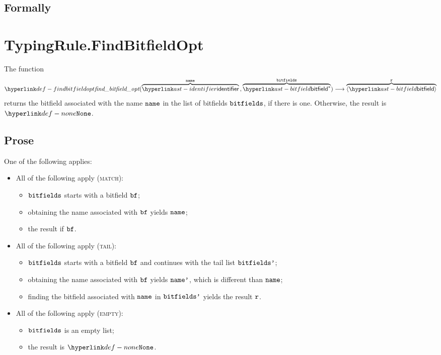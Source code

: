 \subsection{Formally}

\section{TypingRule.FindBitfieldOpt}
\hypertarget{def-findbitfieldopt}{}
The function
\[
  \findbitfieldopt(\overname{\identifier}{\name} \aslsep \overname{\bitfield^*}{\bitfields})
  \aslto \overname{\langle\bitfield\rangle}{\vr}
\]
returns the bitfield associated with the name $\texttt{name}$ in the list of bitfields $\texttt{bitfields}$,
if there is one. Otherwise, the result is $\None$.

\subsection{Prose}
One of the following applies:
\begin{itemize}
  \item All of the following apply (\textsc{match}):
  \begin{itemize}
    \item $\texttt{bitfields}$ starts with a bitfield $\texttt{bf}$;
    \item obtaining the name associated with $\texttt{bf}$ yields $\texttt{name}$;
    \item the result if $\texttt{bf}$.
  \end{itemize}

  \item All of the following apply (\textsc{tail}):
  \begin{itemize}
    \item $\texttt{bitfields}$ starts with a bitfield $\texttt{bf}$ and continues with the tail list $\texttt{bitfields'}$;
    \item obtaining the name associated with $\texttt{bf}$ yields $\texttt{name'}$, which is different than $\texttt{name}$;
    \item finding the bitfield associated with $\texttt{name}$ in $\texttt{bitfields'}$ yields the result $\texttt{r}$.
  \end{itemize}

  \item All of the following apply (\textsc{empty}):
  \begin{itemize}
    \item $\texttt{bitfields}$ is an empty list;
    \item the result is $\None$.
  \end{itemize}
\end{itemize}

